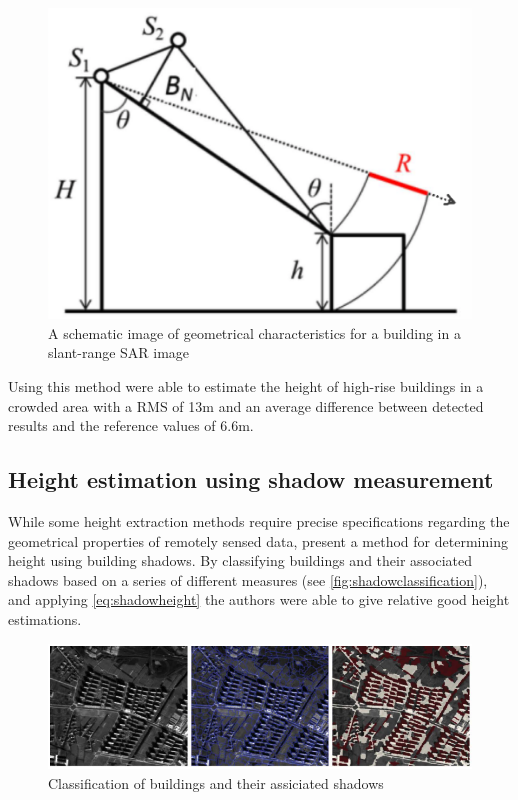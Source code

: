 \begin{figure}[!h]
	\centering
	\includegraphics[scale=0.4]{fig/insar.png}
	\caption{A schematic image of geometrical characteristics for a building in a slant-range SAR image \citep{Liu2015}}
	\label{fig:insar}
\end{figure}

Using this method \cite{Liu2015} were able to estimate the height of high-rise buildings in a crowded area with a RMS of 13m and an average difference between detected results and the reference values of 6.6m.

\subsection{Height estimation using shadow measurement}
While some height extraction methods require precise specifications regarding the geometrical properties of remotely sensed data, \cite{Comber2012} present a method for determining height using building shadows. By classifying buildings and their associated shadows based on a series of different measures (see \autoref{fig:shadowclassification}), and applying \autoref{eq:shadowheight} the authors were able to give relative good height estimations.

\begin{figure}[!h]
	\centering
	\includegraphics[scale=0.6]{fig/shadow_classification.png}
	\caption{Classification of buildings and their assiciated shadows \citep{Comber2012}}
	\label{fig:shadowclassification}
\end{figure}

